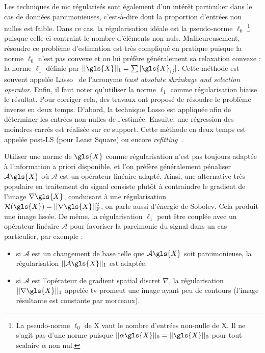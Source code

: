 Les techniques de \gls{mc} régularisés sont également d'un intérêt particulier dans le cas de données  parcimonieuses, c'est-à-dire dont la proportion d'entrées non nulles est faible. Dans ce cas, la régularisation idéale est la pseudo-norme $\ell_0$ \footnote{La pseudo-norme $\ell_0$ de \gls{X} vaut le nombre d'entrées non-nulle de \gls{X}. Il ne s'agit pas d'une norme puisque $||\alpha\gls{X}||_0 = ||\gls{X}||_0$ pour tout scalaire $\alpha$ non nul.} puisque celle-ci contraint le nombre d'éléments non-nuls. Malheureusement, résoudre ce problème d'estimation est très compliqué en pratique puisque la norme $\ell_0$ n'est pas convexe et on lui préfère généralement sa relaxation convexe : la norme $\ell_1$ définie par $||\gls{X}||_1 = \sum |\gls{X}_{ij}|$. Cette méthode est souvent appelée Lasso~\cite{tibshirani1996regression} de l'acronyme \emph{least absolute shrinkage and selection operator}. Enfin, il faut noter qu'utiliser la norme $\ell_1$ comme régularisation biaise le résultat. Pour corriger cela, des travaux ont proposé de résoudre le problème inverse en deux temps. D'abord, la technique Lasso est appliquée afin de déterminer les entrées non-nulles de l'estimée. Ensuite, une régression des moindres carrés est réalisée sur ce support. Cette méthode en deux temps est appelée post-LS (pour Least Square) ou encore \emph{refitting}~\cite{belloni2013least, lederer2013trust, deledalle2017clear}.

Utiliser une norme de $\gls{X}$ comme régularisation n'est pas toujours adaptée à l'information a priori disponible,  et l'on préfère généralement pénaliser $\mathcal{A}\gls{X}$ où $\mathcal{A}$ est un opérateur linéaire adapté. Ainsi, une alternative très populaire en traitement du signal consiste plutôt à contraindre le gradient de l'image $\nabla\gls{X}$, conduisant à une régularisation $\mathcal{R}(\gls{X})=\frobnorm{\nabla\gls{X}}$, on parle aussi d'énergie de Sobolev. Cela produit une image lissée. De même, la régularisation $\ell_1$ peut être couplée avec un opérateur linéaire $\mathcal{A}$ pour favoriser la parcimonie du signal dans un cas particulier, par exemple :
\begin{itemize}
    \item si $\mathcal{A}$ est un changement de base telle que $\mathcal{A}\gls{X}$ soit parcimonieuse, la régularisation $||\mathcal{A}\gls{X}||_1$ est adaptée,
    \item si $\mathcal{A}$ est l'opérateur de gradient spatial discret $\nabla$, la régularisation $||\nabla \gls{X}||_1$ appelée \gls{tv} promeut une image ayant peu de contours (l'image résultante est constante par morceaux).
\end{itemize}


